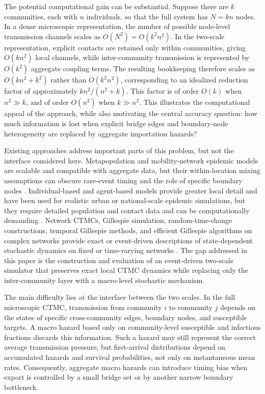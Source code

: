 \documentclass[12pt,a4paper]{article}
\begin{document}
The potential computational gain can be substantial. Suppose there are $k$ communities, each with $n$ individuals, so that the full system has $N = kn$ nodes. In a dense microscopic representation, the number of possible node-level transmission channels scales as $O(N^2) = O(k^2 n^2)$. In the two-scale representation, explicit contacts are retained only within communities, giving $O(kn^2)$ local channels, while inter-community transmission is represented by $O(k^2)$ aggregate coupling terms. The resulting bookkeeping therefore scales as $O(kn^2 + k^2)$ rather than $O(k^2 n^2)$, corresponding to an idealized reduction factor of approximately $k n^2/(n^2 + k)$. This factor is of order $O(k)$ when $n^2 \gg k$, and of order $O(n^2)$ when $k \gg n^2$. This illustrates the computational appeal of the approach, while also motivating the central accuracy question: how much information is lost when explicit bridge edges and boundary-node heterogeneity are replaced by aggregate importation hazards?

Existing approaches address important parts of this problem, but not the interface considered here. Metapopulation and mobility-network epidemic models are scalable and compatible with aggregate data, but their within-location mixing assumptions can obscure rare-event timing and the role of specific boundary nodes \cite{colizza2008,balcan2010modeling,ajelli2010}. Individual-based and agent-based models provide greater local detail and have been used for realistic urban or national-scale epidemic simulations, but they require detailed population and contact data and can be computationally demanding \cite{eubank2004,kerr2021}. Network CTMCs, Gillespie simulation, random-time-change constructions, temporal Gillespie methods, and efficient Gillespie algorithms on complex networks provide exact or event-driven descriptions of state-dependent stochastic dynamics on fixed or time-varying networks \cite{gillespie1977exact,anderson2007,vestergaard2015,kuryliak2025simulating}. The gap addressed in this paper is the construction and evaluation of an event-driven two-scale simulator that preserves exact local CTMC dynamics while replacing only the inter-community layer with a macro-level stochastic mechanism.

The main difficulty lies at the interface between the two scales. In the full microscopic CTMC, transmission from community $i$ to community $j$ depends on the states of specific cross-community edges, boundary nodes, and susceptible targets. A macro hazard based only on community-level susceptible and infectious fractions discards this information. Such a hazard may still represent the correct average transmission pressure, but first-arrival distributions depend on accumulated hazards and survival probabilities, not only on instantaneous mean rates. Consequently, aggregate macro hazards can introduce timing bias when export is controlled by a small bridge set or by another narrow boundary bottleneck.
\end{document}

